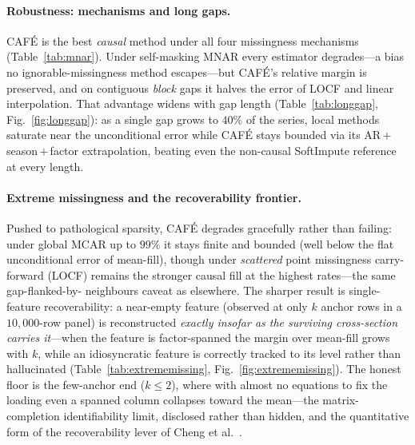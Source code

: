 \documentclass[10pt,twocolumn]{article}
\newcommand{\cafe}{CAF\'E}
\begin{document}
\paragraph{Robustness: mechanisms and long gaps.} \cafe{} is the best
\emph{causal} method under all four missingness mechanisms
(Table~\ref{tab:mnar}). Under self-masking MNAR every estimator degrades---a
bias no ignorable-missingness method escapes---but \cafe{}'s relative margin is
preserved, and on contiguous \emph{block} gaps it halves the error of LOCF and
linear interpolation. That advantage widens with gap length
(Table~\ref{tab:longgap}, Fig.~\ref{fig:longgap}): as a single gap grows to
$40\%$ of the series, local methods saturate near the unconditional error while
\cafe{} stays bounded via its AR\,$+$\,season\,$+$\,factor extrapolation,
beating even the non-causal SoftImpute reference at every length.



\paragraph{Extreme missingness and the recoverability frontier.} Pushed to
pathological sparsity, \cafe{} degrades gracefully rather than failing: under global
MCAR up to $99\%$ it stays finite and bounded (well below the flat unconditional error
of mean-fill), though under \emph{scattered} point missingness carry-forward (LOCF)
remains the stronger causal fill at the highest rates---the same gap-flanked-by-
neighbours caveat as elsewhere. The sharper result is single-feature recoverability: a
near-empty feature (observed at only $k$ anchor rows in a $10{,}000$-row panel) is
reconstructed \emph{exactly insofar as the surviving cross-section carries it}---when
the feature is factor-spanned the margin over mean-fill grows with $k$, while an
idiosyncratic feature is correctly tracked to its level rather than hallucinated
(Table~\ref{tab:extrememissing}, Fig.~\ref{fig:extrememissing}). The honest floor is
the few-anchor end ($k\!\le\!2$), where with almost no equations to fix the loading
even a spanned column collapses toward the mean---the matrix-completion identifiability
limit, disclosed rather than hidden, and the quantitative form of the recoverability
lever of Cheng et al.~\cite{cheng2025causalview}.

\end{document}
